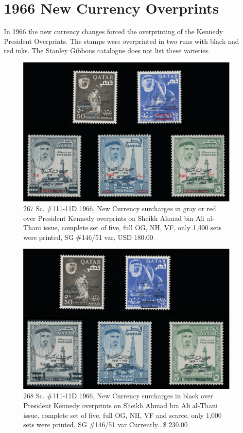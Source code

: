 \section{1966 New Currency Overprints}

In 1966 the new currency changes forced the overprinting of the Kennedy President Overprints. The stamps were overprinted in two runs with black and red inks. The Stanley Gibbons catalogue does not list these varieties.

\begin{figure}[htb]

\includegraphics[width=.80\textwidth]{../qatar/267.jpg} 
\caption{267		Sc. \#111-11D	1966, New Currency surcharges in gray or red over President Kennedy overprints on Sheikh Ahmad bin Ali al-Thani issue, complete set of five, full OG, NH, VF, only 1,400 sets were printed, SG \#146/51 var,  USD 180.00 
}                     

\end{figure} 


\begin{figure}[htb]
\includegraphics[width=.80\textwidth]{../qatar/268.jpg} 
\caption{268		Sc. \#111-11D	1966, New Currency surcharges in black over President Kennedy overprints on Sheikh Ahmad bin Ali al-Thani issue, complete set of five, full OG, NH, VF and scarce, only 1,000 sets were printed, SG \#146/51 var 	
Currently...\$ 230.00 
}                     

\end{figure}           